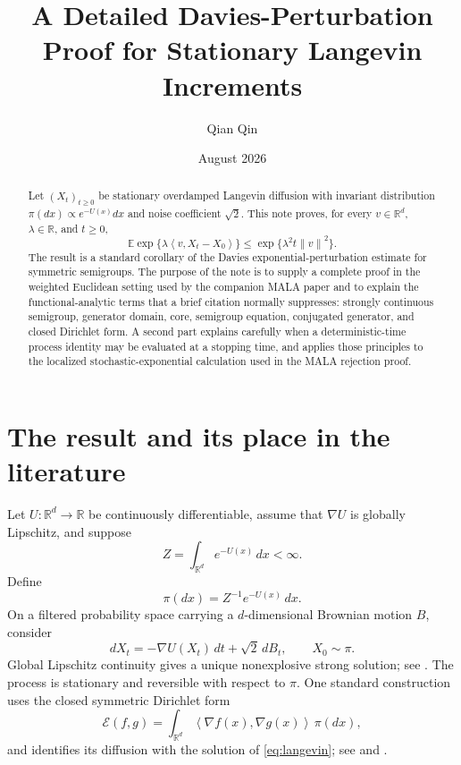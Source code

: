 \documentclass[11pt]{article}
\title{A Detailed Davies-Perturbation Proof for Stationary Langevin Increments}
\author{Qian Qin}
\date{August 2026}
\newcommand{\R}{\mathbb R}
\newcommand{\E}{\mathbb E}
\newcommand{\cE}{\mathcal E}
\newcommand{\ip}[2]{\left\langle #1,#2\right\rangle}
\newcommand{\norm}[1]{\left\lVert #1\right\rVert}
\newcommand{\1}{\mathbf 1}
\begin{document}
\maketitle

\begin{abstract}
Let \((X_t)_{t\geq0}\) be stationary overdamped Langevin diffusion with
invariant distribution \(\pi(dx)\propto e^{-U(x)}dx\) and noise coefficient
\(\sqrt2\).  This note proves, for every \(v\in\R^d\), \(\lambda\in\R\),
and \(t\geq0\),
\[
 \E\exp\{\lambda\ip{v}{X_t-X_0}\}
 \leq \exp\{\lambda^2t\norm v^2\}.
\]
The result is a standard corollary of the Davies exponential-perturbation
estimate for symmetric semigroups.  The purpose of the note is to supply a
complete proof in the weighted Euclidean setting used by the companion MALA
paper and to explain the functional-analytic terms that a brief citation
normally suppresses: strongly continuous semigroup, generator domain,
core, semigroup equation, conjugated generator, and closed Dirichlet form.
A second part explains carefully when a deterministic-time process identity
may be evaluated at a stopping time, and applies those principles to the
localized stochastic-exponential calculation used in the MALA rejection
proof.
\end{abstract}

\tableofcontents

\section{The result and its place in the literature}\label{sec:intro}

Let \(U:\R^d\to\R\) be continuously differentiable, assume that
\(\nabla U\) is globally Lipschitz, and suppose
\[
 Z=\int_{\R^d}e^{-U(x)}\,dx<\infty.
\]
Define
\[
 \pi(dx)=Z^{-1}e^{-U(x)}\,dx.
\]
On a filtered probability space carrying a \(d\)-dimensional Brownian
motion \(B\), consider
\begin{equation}\label{eq:langevin}
 dX_t=-\nabla U(X_t)\,dt+\sqrt2\,dB_t,
 \qquad X_0\sim\pi.
\end{equation}
Global Lipschitz continuity gives a unique nonexplosive strong solution; see
\citet[Chapter~5]{KaratzasShreve1991}.  The process is stationary and
reversible with respect to \(\pi\).  One standard construction uses the
closed symmetric Dirichlet form
\begin{equation}\label{eq:dirichlet-form-intro}
 \cE(f,g)=\int_{\R^d}\ip{\nabla f(x)}{\nabla g(x)}\,\pi(dx),
\end{equation}
and identifies its diffusion with the solution of \eqref{eq:langevin}; see
\citet[Chapters~1 and~7]{FukushimaOshimaTakeda2011} and
\citet{BakryGentilLedoux2014}.
\end{document}
